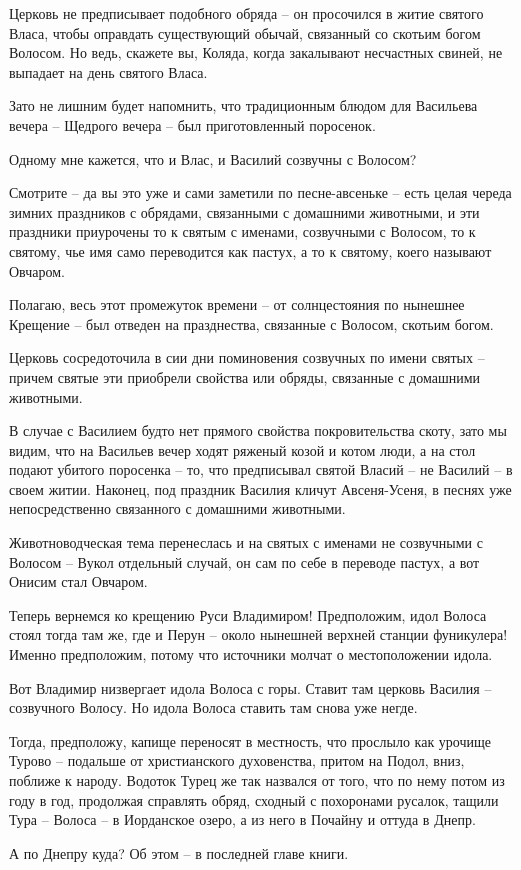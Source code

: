    Церковь не предписывает подобного обряда – он просочился в житие святого Власа, чтобы оправдать существующий обычай, связанный со скотьим богом Волосом. Но ведь, скажете вы, Коляда, когда закалывают несчастных свиней, не выпадает на день святого Власа.

    Зато не лишним будет напомнить, что традиционным блюдом для Васильева вечера – Щедрого вечера – был приготовленный поросенок.

   Одному мне кажется, что и Влас, и Василий созвучны с Волосом?

   Смотрите – да вы это уже и сами заметили по песне-авсеньке – есть целая череда зимних праздников с обрядами, связанными с домашними животными, и эти праздники приурочены то к святым с именами, созвучными с Волосом, то к святому, чье имя само переводится как пастух, а то к святому, коего называют Овчаром.

   Полагаю, весь этот промежуток времени – от солнцестояния по нынешнее Крещение – был отведен на празднества, связанные с Волосом, скотьим богом.

   Церковь сосредоточила в сии дни поминовения созвучных по имени святых – причем святые эти приобрели свойства или обряды, связанные с домашними животными.

   В случае с Василием будто нет прямого свойства покровительства скоту, зато мы видим, что на Васильев вечер ходят ряженый козой и котом люди, а на стол подают убитого поросенка – то, что предписывал святой Власий – не Василий – в своем житии. Наконец, под праздник Василия кличут Авсеня-Усеня, в песнях уже непосредственно связанного с домашними животными.

    Животноводческая тема перенеслась и на святых с именами не созвучными с Волосом – Вукол отдельный случай, он сам по себе в переводе пастух, а вот Онисим стал Овчаром.

   Теперь вернемся ко крещению Руси Владимиром! Предположим, идол Волоса стоял тогда там же, где и Перун – около нынешней верхней станции фуникулера! Именно предположим, потому что источники молчат о местоположении идола.

   Вот Владимир низвергает идола Волоса с горы. Ставит там церковь Василия – созвучного Волосу. Но идола Волоса ставить там снова уже негде.

   Тогда, предположу, капище переносят в местность, что прослыло как урочище Турово – подальше от христианского духовенства, притом на Подол, вниз, поближе к народу. Водоток Турец же так назвался от того, что по нему потом из году в год, продолжая справлять обряд, сходный с похоронами русалок, тащили Тура – Волоса – в Иорданское озеро, а из него в Почайну и оттуда в Днепр.

   А по Днепру куда? Об этом – в последней главе книги.
